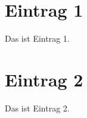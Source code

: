 \documentclass{scrreprt}
\begin{document}
\tableofcontents

\chapter{Eintrag 1}
Das ist Eintrag 1.

\chapter{Eintrag 2}
Das ist Eintrag 2.

\clearpage

\printindex
\end{document}

